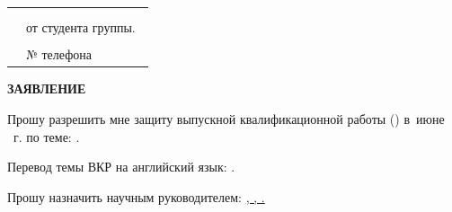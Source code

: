 









\thispagestyle{empty}%

\noindent
\begin{minipage}{\linewidth}
	\vspace{\mfloatsep} %
	\begin{tabularx}{\linewidth}{Xl}
		&\HeadApTitle     \\
		&\HeadAp       \\
		& от студента группы.~\group \\
		& \AuthorFull \\
		& № телефона \AuthorPhone \\
	\end{tabularx}
	\vspace{\mfloatsep} %
\end{minipage}


\vspace{0pt plus1fill} %


{\centering%

	\MakeUppercase{\bfseries{}Заявление} \\



\intervalS%
}\par%

\intervalS%

	Прошу разрешить мне защиту выпускной квалификационной работы (\thesisDegree) в~июне \thesisYear~г. по теме: {\expandafter \ulined \thesisTitle.}

\intervalS%

	Перевод темы ВКР на английский язык:
	{\expandafter \ulined \thesisTitleEn.}





\intervalS%

Прошу назначить научным руководителем: \uline{\SupervisorJobVin, \SupervisorDegree, \SupervisorVin.}


